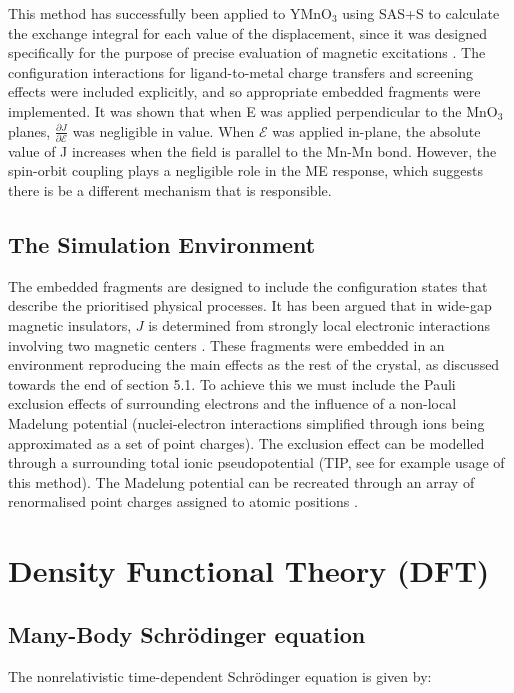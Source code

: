 \documentclass[10pt]{article}
\begin{document}
This method has successfully been applied to YMnO$_3$ using SAS+S to calculate the exchange integral for each value of the displacement, since it was designed specifically for the purpose of precise evaluation of magnetic excitations \cite{varignon2013ab}. The configuration interactions for ligand-to-metal charge transfers and screening effects were included explicitly, and so appropriate embedded fragments were implemented. It was shown that when E was applied perpendicular to the MnO$_3$ planes, $\frac{\partial J}{\partial \mathcal{E}}$  was negligible in value. When $\mathcal{E}$ was applied in-plane, the absolute value of J increases when the field is parallel to the Mn-Mn bond. However, the spin-orbit coupling plays a negligible role in the ME response, which suggests there is be a different mechanism that is responsible.

\subsection{The Simulation Environment}
The embedded fragments are designed to include the configuration states that describe the prioritised physical processes. It has been argued that in wide-gap magnetic insulators, $J$ is determined from strongly local electronic interactions involving two magnetic centers \cite{de1999local}. These fragments were embedded in an environment reproducing the main effects as the rest of the crystal, as discussed towards the end of section 5.1. To achieve this we must include the Pauli exclusion effects of surrounding electrons and the influence of a non-local Madelung potential (nuclei-electron interactions simplified through ions being approximated as a set of point charges). The exclusion effect can be modelled through a surrounding total ionic pseudopotential (TIP, see \cite{winter1987theoretical} for example usage of this method). The Madelung potential can be recreated through an array of renormalised point charges assigned to atomic positions \cite{gelle2008fast}.

\section{Density Functional Theory (DFT)}
\subsection{Many-Body Schrödinger equation}
The nonrelativistic time-dependent Schrödinger equation is given by:
\end{document}
